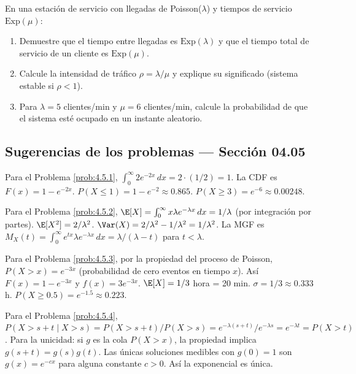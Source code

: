 \begin{problema}
	\label{prob:4.5.10}
	En una estación de servicio con llegadas de Poisson($\lambda$) y tiempos de servicio $\text{Exp}(\mu)$:
	\begin{enumerate}
		\item Demuestre que el tiempo entre llegadas es $\text{Exp}(\lambda)$ y que el tiempo total de servicio de un cliente es $\text{Exp}(\mu)$.
		\item Calcule la intensidad de tráfico $\rho = \lambda/\mu$ y explique su significado (sistema estable si $\rho < 1$).
		\item Para $\lambda = 5$ clientes/min y $\mu = 6$ clientes/min, calcule la probabilidad de que el sistema esté ocupado en un instante aleatorio.
	\end{enumerate}
\end{problema}

\subsection*{Sugerencias de los problemas --- Sección 04.05}

\begin{sugerencia}
	\label{sug:4.5.1}
	Para el Problema \ref{prob:4.5.1}, $\int_{0}^{\infty} 2e^{-2x}\,dx = 2 \cdot (1/2) = 1$. La CDF es $F(x) = 1 - e^{-2x}$. $P(X \le 1) = 1 - e^{-2} \approx 0.865$. $P(X \ge 3) = e^{-6} \approx 0.00248$.
\end{sugerencia}

\begin{sugerencia}
	\label{sug:4.5.2}
	Para el Problema \ref{prob:4.5.2}, $\E[X] = \int_{0}^{\infty} x \lambda e^{-\lambda x}\,dx = 1/\lambda$ (por integración por partes). $\E[X^{2}] = 2/\lambda^{2}$. $\Var(X) = 2/\lambda^{2} - 1/\lambda^{2} = 1/\lambda^{2}$. La MGF es $M_{X}(t) = \int_{0}^{\infty} e^{tx} \lambda e^{-\lambda x}\,dx = \lambda/(\lambda - t)$ para $t < \lambda$.
\end{sugerencia}

\begin{sugerencia}
	\label{sug:4.5.3}
	Para el Problema \ref{prob:4.5.3}, por la propiedad del proceso de Poisson, $P(X > x) = e^{-3x}$ (probabilidad de cero eventos en tiempo $x$). Así $F(x) = 1 - e^{-3x}$ y $f(x) = 3e^{-3x}$. $\E[X] = 1/3$ hora = 20 min. $\sigma = 1/3 \approx 0.333$ h. $P(X \ge 0.5) = e^{-1.5} \approx 0.223$.
\end{sugerencia}

\begin{sugerencia}
	\label{sug:4.5.4}
	Para el Problema \ref{prob:4.5.4}, $P(X > s + t \mid X > s) = P(X > s + t)/P(X > s) = e^{-\lambda(s+t)}/e^{-\lambda s} = e^{-\lambda t} = P(X > t)$. Para la unicidad: si $g$ es la cola $P(X > x)$, la propiedad implica $g(s+t) = g(s) g(t)$. Las únicas soluciones medibles con $g(0) = 1$ son $g(x) = e^{-cx}$ para alguna constante $c > 0$. Así la exponencial es única.
\end{sugerencia}

